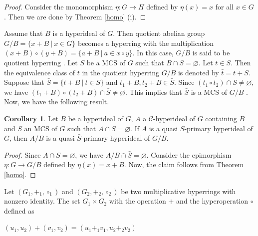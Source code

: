 \documentclass[preprint,review,10pt]{amsart}
\theoremstyle{definition}
\newtheorem{corollary}[theorem]{Corollary}
\theoremstyle{remark}
\numberwithin{equation}{section}
\begin{document}
\begin{proof}
Consider the monomorphism $\eta: G \longrightarrow H$ defined by $\eta(x)=x$ for all $x \in G$. Then we are done by Theorem \ref{homo} (i). 
\end{proof}
 Assume that $B$ is a hyperideal of $G$.  Then quotient abelian group $G/B=\{x+B \ \vert \ x \in G\}$ becomes a hyperring with the multiplication $(x+B) \circ (y+B)=\{a+B \ \vert \ a \in x \circ y\}$. In this case, $G/B$ is said to be quotient hyperring \cite{Sen}. Let $S$ be a MCS of $G$ such that $B \cap S= \varnothing$. Let $t \in S$. Then the equivalence class
of $t$ in the quotient hyperring $G/B$ is denoted by $\bar{t}=t+S$. Suppose that $\bar{S}=\{t+B \ \vert \ t \in S\}$ and $t_1+B, t_2+B \in \bar{S}$. Since $(t_1 \circ t_2)  \cap S \neq \varnothing$, we have $(t_1+B)\circ  (t_2+B ) \cap \bar{S} \neq \varnothing$. This implies that $\bar{S}$ is a MCS of $G/B$ \cite{Ghiasvand}.
Now, we have the following result.
\begin{corollary}
Let $B$ be a hyperideal of $G$, $A$     a $\mathcal{C}$-hyperideal  of $G$ containing   $B$ and $S$    an MCS of $G $ such that $A \cap S=\varnothing$. If $A$ is a quasi $S$-primary  hyperideal of $G$, then $A/B$   is a quasi $\bar{S}$-primary  hyperideal of $G/B$.
\end{corollary}
\begin{proof}
Since $A \cap S=\varnothing$, we have $A/B \cap \bar{S}=\varnothing$. Consider the  epimorphism $\eta :G \longrightarrow G/B$ defined by $\eta(x)=x+B$. Now,  the claim follows from Theorem \ref{homo}. 
\end{proof}

Let $(G_1,+_1,\circ_1)$ and $(G_2,+_2,\circ_2)$ be two multiplicative hyperrings with nonzero identity. The set $G_1 \times G_2$ with the operation $+$ and the hyperoperation $\circ$ defined as 


$(u_1,u_2)+(v_1,v_2)=(u_1+_1v_1,u_2+_2v_2)$ 
\end{document}
